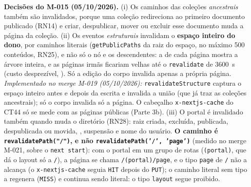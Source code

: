 \textbf{Decisões do M-015 (05/10/2026).} (i) Os caminhos das coleções \emph{ancestrais} também são invalidados, porque uma coleção redireciona ao primeiro documento publicado (RN14) e criar, despublicar, mover ou excluir esse documento muda a página da coleção. (ii) Os eventos \emph{estruturais} invalidam o \textbf{espaço inteiro do dono}, por caminhos literais (\texttt{getPublicPaths} da raiz do espaço, no máximo 500 conteúdos, RN25), e não só o nó e os descendentes: a  de cada página mostra a árvore inteira, e as páginas irmãs ficariam velhas até o \texttt{revalidate} de 3600~s (custo desprezível, ). Só a edição do corpo invalida apenas a própria página. \emph{Implementado no merge M-019 (05/10/2026):} \texttt{revalidateStructure} captura o espaço inteiro antes e depois da escrita e invalida a união (que já traz as coleções ancestrais); só o corpo invalida só a página. O cabeçalho \texttt{x-nextjs-cache} do CT44 só se mede com as páginas públicas (Parte 3b). (iii) O portal é invalidado também quando muda o diretório (RN28): raiz criada, excluída, publicada, despublicada ou movida, , suspensão e nome do usuário. \textbf{O caminho é \texttt{revalidatePath("/")}, e não \texttt{revalidatePath('/', 'page')}} (medido no merge M-021, sobre o \texttt{next start}): com o portal em um grupo de rotas (\texttt{(portal)}, que dá o layout só a \texttt{/}), a página se chama \texttt{/(portal)/page}, e o tipo \texttt{page} de \texttt{/} não a alcança (o \texttt{x-nextjs-cache} seguia \texttt{HIT} depois do \texttt{PUT}); o caminho literal sem tipo a regenera (\texttt{MISS}) e continua sendo literal: o tipo \texttt{layout} segue proibido.

